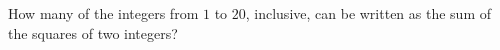 How many of the integers from $1$ to $20$, inclusive, can be written as the sum of the squares of two integers?
